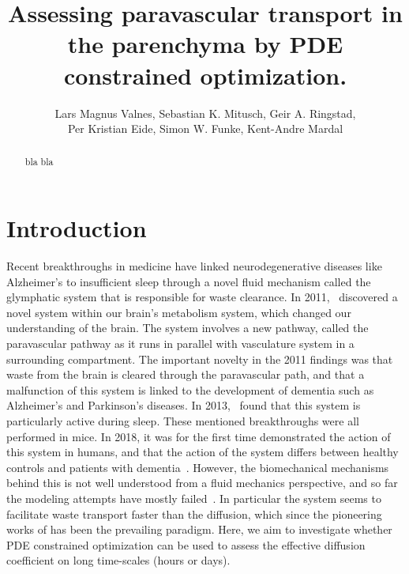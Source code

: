 \documentclass[11pt,a4paper]{article}
\title{Assessing paravascular transport in the parenchyma by PDE constrained optimization.}
\author{Lars Magnus Valnes, Sebastian K. Mitusch, Geir A. Ringstad, \\ 
Per Kristian Eide, Simon W. Funke, Kent-Andre Mardal }
\begin{document}
\maketitle

\begin{abstract}
bla bla 
\end{abstract}
\section{Introduction}
Recent breakthroughs in medicine have linked neurodegenerative diseases like Alzheimer's to insufficient sleep through a novel fluid mechanism called the glymphatic system 
that is responsible for waste clearance. 
In 2011,~\citet{iliff2012paravascular} discovered a novel system within our brain's metabolism system, which changed our understanding of the brain. 
The system involves a new pathway, called the paravascular pathway as it runs in parallel with vasculature system in a surrounding compartment.
The important novelty in the 2011 findings was that waste from the brain is cleared through the paravascular path, and that a malfunction of this system 
is linked to the development of dementia such as Alzheimer's and Parkinson's diseases. In 2013,~\citet{xie2013sleep} found
that this system is particularly active during sleep.
These mentioned breakthroughs were all performed in mice. In 2018,  
it was for the first time demonstrated the action of
this system in humans, and that the action of the system differs
between healthy controls and patients with dementia~\citet{ringstad2018brain}. 
However, the biomechanical mechanisms behind this is not well understood from a fluid mechanics perspective,
and so far the modeling attempts have mostly failed~\citet{asgari2016glymphatic, holter2017interstitial, smith2017glymphatic}. 
In particular the system seems to facilitate waste transport faster than  
the diffusion, which since the pioneering works of \citet{sykova2008diffusion} 
has been the prevailing paradigm. Here, we aim to investigate whether PDE constrained optimization can be used
to assess the effective diffusion coefficient on long time-scales (hours or days).   
\end{document}
